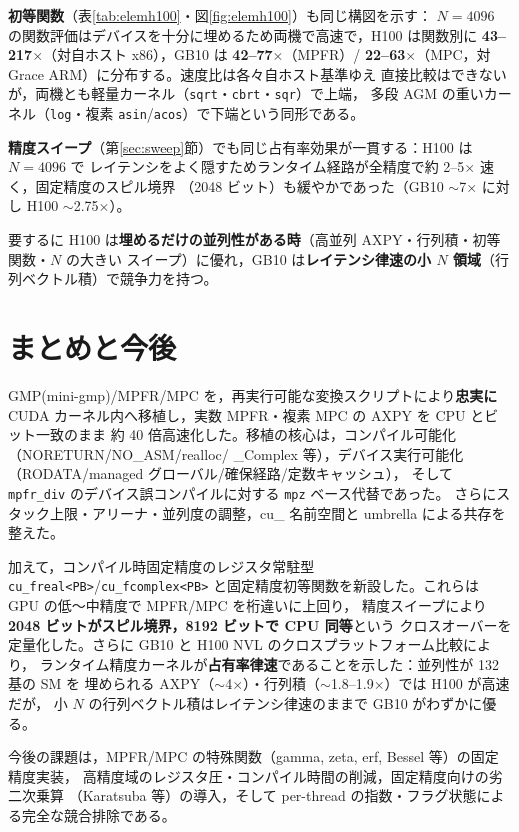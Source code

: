 \documentclass[uplatex,dvipdfmx,a4paper,11pt]{jsarticle}
\newcommand{\code}[1]{\texttt{#1}}
\begin{document}
\textbf{初等関数}（表\ref{tab:elemh100}・図\ref{fig:elemh100}）も同じ構図を示す：
$N=4096$ の関数評価はデバイスを十分に埋めるため両機で高速で，H100 は関数別に
\textbf{43--217$\times$}（対自ホスト x86），GB10 は \textbf{42--77$\times$}（MPFR）/
\textbf{22--63$\times$}（MPC，対 Grace ARM）に分布する。速度比は各々自ホスト基準ゆえ
直接比較はできないが，両機とも軽量カーネル（\code{sqrt}・\code{cbrt}・\code{sqr}）で上端，
多段 AGM の重いカーネル（\code{log}・複素 \code{asin}/\code{acos}）で下端という同形である。

\textbf{精度スイープ}（第\ref{sec:sweep}節）でも同じ占有率効果が一貫する：H100 は $N=4096$ で
レイテンシをよく隠すためランタイム経路が全精度で約 2--5$\times$ 速く，固定精度のスピル境界
（2048 ビット）も緩やかであった（GB10 $\sim$7$\times$ に対し H100 $\sim$2.75$\times$）。

要するに H100 は\textbf{埋めるだけの並列性がある時}（高並列 AXPY・行列積・初等関数・$N$ の大きい
スイープ）に優れ，GB10 は\textbf{レイテンシ律速の小 $N$ 領域}（行列ベクトル積）で競争力を持つ。

\section{まとめと今後}
\label{sec:conclusion}

GMP(mini-gmp)/MPFR/MPC を，再実行可能な変換スクリプトにより\textbf{忠実に}
CUDA カーネル内へ移植し，実数 MPFR・複素 MPC の AXPY を CPU とビット一致のまま
約 40 倍高速化した。移植の核心は，コンパイル可能化（NORETURN/NO\_ASM/realloc/
\_Complex 等），デバイス実行可能化（RODATA/managed グローバル/確保経路/定数キャッシュ），
そして \code{mpfr\_div} のデバイス誤コンパイルに対する \code{mpz} ベース代替であった。
さらにスタック上限・アリーナ・並列度の調整，cu\_ 名前空間と umbrella による共存を整えた。

加えて，コンパイル時固定精度のレジスタ常駐型 \code{cu\_freal<PB>}/\code{cu\_fcomplex<PB>}
と固定精度初等関数を新設した。これらは GPU の低〜中精度で MPFR/MPC を桁違いに上回り，
精度スイープにより\textbf{2048 ビットがスピル境界，8192 ビットで CPU 同等}という
クロスオーバーを定量化した。さらに GB10 と H100 NVL のクロスプラットフォーム比較により，
ランタイム精度カーネルが\textbf{占有率律速}であることを示した：並列性が 132 基の SM を
埋められる AXPY（$\sim$4$\times$）・行列積（$\sim$1.8--1.9$\times$）では H100 が高速だが，
小 $N$ の行列ベクトル積はレイテンシ律速のままで GB10 がわずかに優る。

今後の課題は，MPFR/MPC の特殊関数（gamma, zeta, erf, Bessel 等）の固定精度実装，
高精度域のレジスタ圧・コンパイル時間の削減，固定精度向けの劣二次乗算
（Karatsuba 等）の導入，そして per-thread の指数・フラグ状態による完全な競合排除である。
\end{document}
